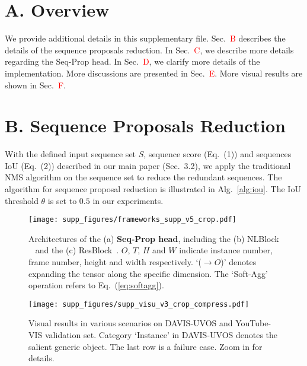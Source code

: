 \documentclass[10pt,twocolumn,letterpaper]{article}
\begin{document}
	\clearpage
	{\small
		
		
	}
	
\newpage
	
	\section*{A. Overview}
	We provide additional details in this supplementary file. Sec.~\textcolor{red}{B} describes the details of the sequence proposals reduction. In Sec.~\textcolor{red}{C}, we describe more details regarding the Seq-Prop head. In Sec.~\textcolor{red}{D}, we clarify more details of the implementation. More discussions are presented in Sec.~\textcolor{red}{E}. More visual results are shown in Sec.~\textcolor{red}{F}.
	
    \section*{B. Sequence Proposals Reduction} \label{sec:seq_reduce}
	With the defined input sequence set $S$, sequence score (Eq.~(1)) and sequences IoU (Eq.~(2)) described in our main paper (Sec.~3.2), we apply the traditional NMS algorithm on the sequence set to reduce the redundant sequences. The algorithm for sequence proposal reduction is illustrated in Alg.~\ref{alg:iou}. The IoU threshold $\theta$ is set to $0.5$ in our experiments.
	
	
	\begin{figure*}[h]
		\begin{center}
			\texttt{[image: supp\_figures/frameworks\_supp\_v5\_crop.pdf]}
		\end{center}
		\caption{Architectures of the (a) \textbf{Seq-Prop head}, including the (b) NLBlock ~\cite{wang2018non} and the (c) ResBlock~\cite{he2016deep}. $O$, $T$, $H$ and $W$ indicate instance number, frame number, height and width respectively. `($\to O$)' denotes expanding the tensor along the specific dimension. The `Soft-Agg' operation refers to Eq.~(\ref{eq:softagg}).}
		\label{fig:arc}
	\end{figure*}
	
	\begin{figure*}[t!]
		\begin{center}
			\texttt{[image: supp\_figures/supp\_visu\_v3\_crop\_compress.pdf]}
		\end{center}
		\caption{Visual results in various scenarios on DAVIS-UVOS and YouTube-VIS validation set. Category `Instance' in DAVIS-UVOS denotes the salient generic object. The last row is a failure case.
		Zoom in for details.}
		\label{fig:visu}
		\vspace{0.1in}
	\end{figure*}
	
\end{document}
